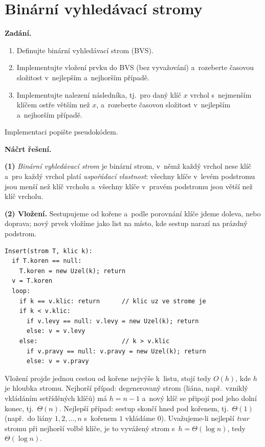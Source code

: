 \section{Binární vyhledávací stromy}

\noindent\textbf{Zadání.}\par
\begin{enumerate}
\item Definujte binární vyhledávací strom (BVS).
\item Implementujte vložení prvku do BVS (bez vyvažování) a~rozeberte časovou
  složitost v~nejlepším a~nejhorším případě.
\item Implementujte nalezení následníka, tj.\ pro daný klíč $x$ vrchol s~nejmenším
  klíčem ostře větším než $x$, a~rozeberte časovou složitost v~nejlepším
  a~nejhorším případě.
\end{enumerate}
Implementaci popište pseudokódem.

\medskip
\noindent\textbf{Náčrt řešení.}\par

\textbf{(1)} \emph{Binární vyhledávací strom} je binární strom, v~němž každý vrchol
nese klíč a~pro každý vrchol platí \emph{uspořádací vlastnost}: všechny klíče
v~levém podstromu jsou menší než klíč vrcholu a~všechny klíče v~pravém podstromu
jsou větší než klíč vrcholu.

\textbf{(2) Vložení.} Sestupujeme od kořene a~podle porovnání klíče jdeme doleva,
nebo doprava; nový prvek vložíme jako list na místo, kde sestup narazí na prázdný
podstrom.
\begin{lstlisting}
Insert(strom T, klic k):
  if T.koren == null:
    T.koren = new Uzel(k); return
  v = T.koren
  loop:
    if k == v.klic: return      // klic uz ve strome je
    if k < v.klic:
      if v.levy == null: v.levy = new Uzel(k); return
      else: v = v.levy
    else:                       // k > v.klic
      if v.pravy == null: v.pravy = new Uzel(k); return
      else: v = v.pravy
\end{lstlisting}
Vložení projde jednou cestou od kořene nejvýše k~listu, stojí tedy $O(h)$, kde $h$ je
hloubka stromu. Nejhorší případ: degenerovaný strom (liána, např.\ vzniklý vkládáním
setříděných klíčů) má $h=n-1$ a~nový klíč se připojí pod jeho dolní konec, tj.\ $\Theta(n)$.
Nejlepší případ: sestup skončí hned pod kořenem, tj.\ $\Theta(1)$ (např.\ do liány
$1,2,\dots,n$ s~kořenem $1$ vkládáme $0$). Uvažujeme-li nejlepší \emph{tvar} stromu
při nejhorší volbě klíče, je to vyvážený strom s~$h=\Theta(\log n)$, tedy $\Theta(\log n)$.


